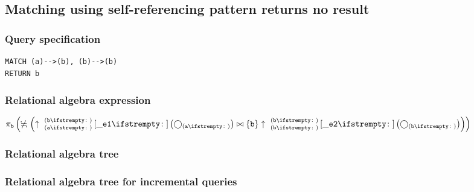 \subsection{Matching using self-referencing pattern returns no result}

\subsubsection*{Query specification}

\begin{lstlisting}
MATCH (a)-->(b), (b)-->(b)
RETURN b
\end{lstlisting}

\subsubsection*{Relational algebra expression}

$\projection{\var{b}} \left(\alldifferent{} \left(\expandout{a}{b}{}{\_e1}{} \left(\getvertices{a}{}\right) \join \{\var{b}\} \expandout{b}{b}{}{\_e2}{} \left(\getvertices{b}{}\right)\right)\right)$

\subsubsection*{Relational algebra tree}


\subsubsection*{Relational algebra tree for incremental queries}

